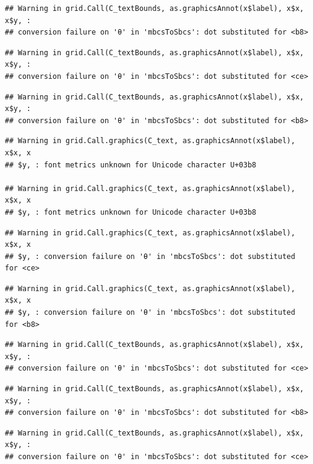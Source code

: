 \documentclass[]{book}
\theoremstyle{definition}
\theoremstyle{definition}
\theoremstyle{definition}
\theoremstyle{remark}
\begin{document}
\begin{verbatim}
## Warning in grid.Call(C_textBounds, as.graphicsAnnot(x$label), x$x, x$y, :
## conversion failure on 'θ' in 'mbcsToSbcs': dot substituted for <b8>
\end{verbatim}

\begin{verbatim}
## Warning in grid.Call(C_textBounds, as.graphicsAnnot(x$label), x$x, x$y, :
## conversion failure on 'θ' in 'mbcsToSbcs': dot substituted for <ce>
\end{verbatim}

\begin{verbatim}
## Warning in grid.Call(C_textBounds, as.graphicsAnnot(x$label), x$x, x$y, :
## conversion failure on 'θ' in 'mbcsToSbcs': dot substituted for <b8>
\end{verbatim}

\begin{verbatim}
## Warning in grid.Call.graphics(C_text, as.graphicsAnnot(x$label), x$x, x
## $y, : font metrics unknown for Unicode character U+03b8

## Warning in grid.Call.graphics(C_text, as.graphicsAnnot(x$label), x$x, x
## $y, : font metrics unknown for Unicode character U+03b8
\end{verbatim}

\begin{verbatim}
## Warning in grid.Call.graphics(C_text, as.graphicsAnnot(x$label), x$x, x
## $y, : conversion failure on 'θ' in 'mbcsToSbcs': dot substituted for <ce>
\end{verbatim}

\begin{verbatim}
## Warning in grid.Call.graphics(C_text, as.graphicsAnnot(x$label), x$x, x
## $y, : conversion failure on 'θ' in 'mbcsToSbcs': dot substituted for <b8>
\end{verbatim}

\begin{verbatim}
## Warning in grid.Call(C_textBounds, as.graphicsAnnot(x$label), x$x, x$y, :
## conversion failure on 'θ' in 'mbcsToSbcs': dot substituted for <ce>
\end{verbatim}

\begin{verbatim}
## Warning in grid.Call(C_textBounds, as.graphicsAnnot(x$label), x$x, x$y, :
## conversion failure on 'θ' in 'mbcsToSbcs': dot substituted for <b8>
\end{verbatim}

\begin{verbatim}
## Warning in grid.Call(C_textBounds, as.graphicsAnnot(x$label), x$x, x$y, :
## conversion failure on 'θ' in 'mbcsToSbcs': dot substituted for <ce>
\end{verbatim}
\end{document}
